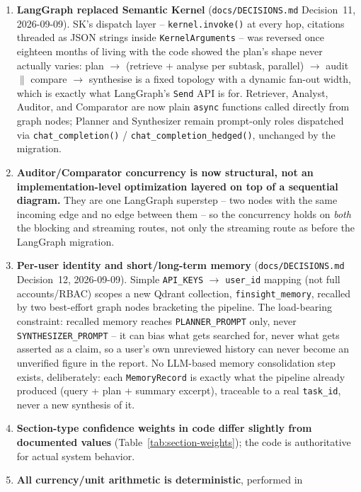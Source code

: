 \documentclass[11pt,a4paper]{report}
\newcommand{\code}[1]{\texttt{#1}}
\newcommand{\file}[1]{\texttt{\small #1}}
\begin{document}
\begin{enumerate}[leftmargin=1.5em]
    \item \textbf{LangGraph replaced Semantic Kernel} (\file{docs/DECISIONS.md}
    Decision~11, 2026-09-09). SK's dispatch layer -- \code{kernel.invoke()} at every
    hop, citations threaded as JSON strings inside \code{KernelArguments} -- was
    reversed once eighteen months of living with the code showed the plan's shape
    never actually varies: plan $\rightarrow$ (retrieve + analyse per subtask,
    parallel) $\rightarrow$ audit $\parallel$ compare $\rightarrow$ synthesise is a
    fixed topology with a dynamic fan-out width, which is exactly what LangGraph's
    \code{Send} API is for. Retriever, Analyst, Auditor, and Comparator are now plain
    \code{async} functions called directly from graph nodes; Planner and Synthesizer
    remain prompt-only roles dispatched via \code{chat\_completion()} /
    \code{chat\_completion\_hedged()}, unchanged by the migration.
    \item \textbf{Auditor/Comparator concurrency is now structural, not an
    implementation-level optimization layered on top of a sequential diagram.} They
    are one LangGraph superstep -- two nodes with the same incoming edge and no edge
    between them -- so the concurrency holds on \emph{both} the blocking and streaming
    routes, not only the streaming route as before the LangGraph migration.
    \item \textbf{Per-user identity and short/long-term memory} (\file{docs/DECISIONS.md}
    Decision~12, 2026-09-09). Simple \code{API\_KEYS} $\to$ \code{user\_id}
    mapping (not full accounts/RBAC) scopes a new Qdrant collection,
    \code{finsight\_memory}, recalled by two best-effort graph nodes bracketing
    the pipeline. The load-bearing constraint: recalled memory reaches
    \code{PLANNER\_PROMPT} only, never \code{SYNTHESIZER\_PROMPT} -- it can
    bias what gets searched for, never what gets asserted as a claim, so a
    user's own unreviewed history can never become an unverified figure in the
    report. No LLM-based memory consolidation step exists, deliberately: each
    \code{MemoryRecord} is exactly what the pipeline already produced (query +
    plan + summary excerpt), traceable to a real \code{task\_id}, never a new
    synthesis of it.
    \item \textbf{Section-type confidence weights in code differ slightly from
    documented values} (Table~\ref{tab:section-weights}); the code is authoritative
    for actual system behavior.
    \item \textbf{All currency/unit arithmetic is deterministic}, performed in

\end{enumerate}
\end{document}
